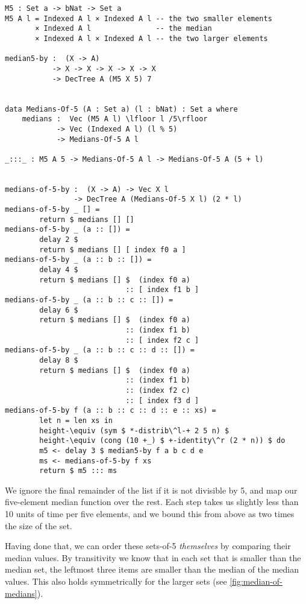 \begin{lstlisting}[caption={Median of 5},label={lst:median:medofmeds},emph={M,median,by,medians,of}]
M5 : Set a -> bNat -> Set a
M5 A l = Indexed A l × Indexed A l -- the two smaller elements
       × Indexed A l               -- the median
       × Indexed A l × Indexed A l -- the two larger elements

median5-by :  (X -> A)
           -> X -> X -> X -> X -> X
           -> DecTree A (M5 X 5) 7


data Medians-Of-5 (A : Set a) (l : bNat) : Set a where
    medians :  Vec (M5 A l) \lfloor l /5\rfloor
            -> Vec (Indexed A l) (l % 5)
            -> Medians-Of-5 A l

_:::_ : M5 A 5 -> Medians-Of-5 A l -> Medians-Of-5 A (5 + l)


medians-of-5-by :  (X -> A) -> Vec X l
                -> DecTree A (Medians-Of-5 X l) (2 * l)
medians-of-5-by _ [] =
        return $ medians [] []
medians-of-5-by _ (a :: []) =
        delay 2 $
        return $ medians [] [ index f0 a ]
medians-of-5-by _ (a :: b :: []) =
        delay 4 $
        return $ medians [] $  (index f0 a)
                            :: [ index f1 b ]
medians-of-5-by _ (a :: b :: c :: []) =
        delay 6 $
        return $ medians [] $  (index f0 a)
                            :: (index f1 b)
                            :: [ index f2 c ]
medians-of-5-by _ (a :: b :: c :: d :: []) =
        delay 8 $
        return $ medians [] $  (index f0 a)
                            :: (index f1 b)
                            :: (index f2 c)
                            :: [ index f3 d ]
medians-of-5-by f (a :: b :: c :: d :: e :: xs) =
        let n = len xs in
        height-\equiv (sym $ *-distrib\^l-+ 2 5 n) $
        height-\equiv (cong (10 +_) $ +-identity\^r (2 * n)) $ do
        m5 <- delay 3 $ median5-by f a b c d e
        ms <- medians-of-5-by f xs
        return $ m5 ::: ms

\end{lstlisting}

We ignore the final remainder of the list if it is not divisible by 5, and map our five-element median function over the rest. Each step takes us slightly less than 10 units of time per five elements, and we bound this from above as two times the size of the set.

Having done that, we can order these sets-of-5 \emph{themselves} by comparing their median values. By transitivity we know that in each set that is smaller than the median set, the leftmost three items are smaller than the median of the median values. This also holds symmetrically for the larger sets (see \autoref{fig:median-of-medians}).

